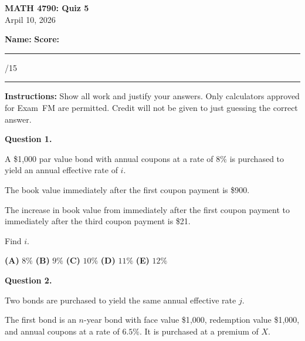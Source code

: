 \documentclass[11pt]{article}
\begin{document}
\begin{center}
    {\Large \textbf{MATH 4790: Quiz 5}}\\[0.3em]
    Arpil 10, 2026
\end{center}

\vspace{1em}

\textbf{Name:} \hfill \textbf{Score:} \rule{1.5cm}{0.4pt}/15

\vspace{1em}

\hrule
\vspace{1em}

\textbf{Instructions:} Show all work and justify your answers. Only calculators approved for Exam~FM are permitted. Credit will not be given to just guessing the correct answer.

\vspace{1em}


\noindent\textbf{Question 1.}  

A \$1{,}000 par value bond with annual coupons at a rate of $8\%$ is purchased to yield an annual effective rate of $i$.

The book value immediately after the first coupon payment is \$900.

The increase in book value from immediately after the first coupon payment to immediately after the third coupon payment is \$21.

Find $i$.

\medskip

\begin{center}

\textbf{(A)} $8\%$
\hspace{1cm}
\textbf{(B)} $9\%$
\hspace{1cm}
\textbf{(C)} $10\%$
\hspace{1cm}
\textbf{(D)} $11\%$
\hspace{1cm}
\textbf{(E)} $12\%$

\end{center}

\newpage


\noindent\textbf{Question 2.}  

Two bonds are purchased to yield the same annual effective rate \(j\).

The first bond is an \(n\)-year bond with face value \$1{,}000, redemption value \$1{,}000, and annual coupons at a rate of \(6.5\%\). It is purchased at a premium of \(X\).
\end{document}

